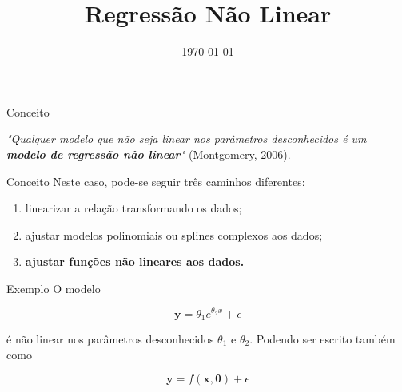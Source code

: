 \documentclass[xcolor=dvipsnames]{beamer}
\title[]{Regressão Não Linear}
\date{\today}
\author[Caroline Vasconcelos]
{}
\institute[]{Modelos de Regressão}
\begin{document}
	
	\begin{frame}
		\titlepage
	\end{frame}

        \begin{frame}{Conceito}

        \textit{"Qualquer modelo que não seja linear nos parâmetros desconhecidos é um \textbf{modelo de regressão não linear}"} (Montgomery, 2006).   
        \end{frame}

        \begin{frame}{Conceito}
        Neste caso, pode-se seguir três caminhos diferentes:
        \begin{enumerate}
            \item  linearizar a relação transformando os dados;
            \item ajustar modelos polinomiais ou splines complexos aos dados;
            \item \textbf{ajustar funções não lineares aos dados.}
        \end{enumerate}
            
        \end{frame}

         \begin{frame}{Exemplo}
         O modelo

       \alert{$$\textbf{y} =\theta_{1}e^{\theta_{2}x}+\epsilon$$}

        é não linear nos parâmetros desconhecidos \alert{$\theta_{1}$} e \alert{$\theta_{2}$}. Podendo ser escrito também como

        \alert{$$\textbf{y} = f(\textbf{x},\bm{\theta}) + \epsilon$$}
            
        \end{frame}
\end{document}
